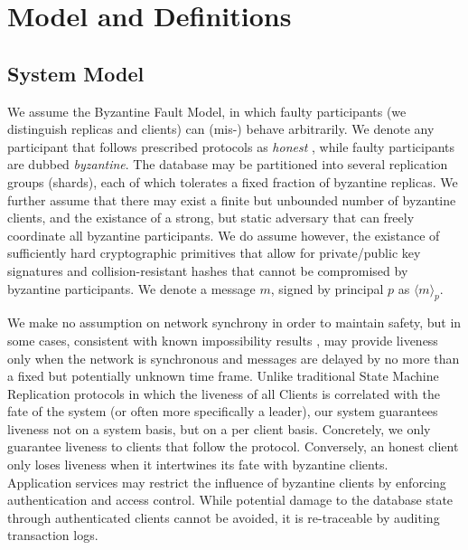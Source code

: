 \section{Model and Definitions}


\subsection{System Model}
We assume the Byzantine Fault Model, in which faulty participants (we distinguish replicas and clients) can (mis-) behave arbitrarily. We denote any participant that follows prescribed protocols as \textit{honest} , while faulty participants are dubbed \textit{byzantine}. The database may be partitioned into several replication groups (shards), each of which tolerates a fixed fraction of byzantine replicas. We further assume that there may exist a finite but unbounded number of byzantine clients, and the existance of a strong, but static adversary that can freely coordinate all byzantine participants. We do assume however, the existance of sufficiently hard cryptographic primitives that allow for private/public key signatures and collision-resistant hashes that cannot be compromised by byzantine participants. We denote a message $m$, signed by principal $p$ as $\langle m \rangle_p$. 
 
We make no assumption on network synchrony in order to maintain safety, but in some cases, consistent with known impossibility results \cite{fischer1985impossibility}, may provide liveness only when the network is synchronous and messages are delayed by no more than a fixed but potentially unknown time frame. 
Unlike traditional State Machine Replication protocols in which the liveness of all Clients is correlated with the fate of the system (or often more specifically a leader), our system guarantees liveness not on a system basis, but on a per client basis. Concretely, we only guarantee liveness to clients that follow the protocol. Conversely, an honest client only loses liveness when it intertwines its fate with byzantine clients.\\

Application services may restrict the influence of byzantine clients by enforcing authentication and access control. While potential damage to the database state through authenticated clients cannot be avoided, it is re-traceable by auditing transaction logs.\\
